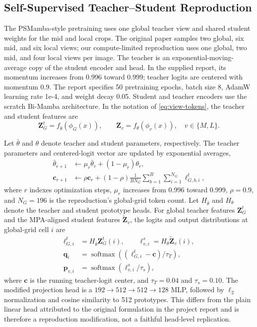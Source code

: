 \documentclass[conference]{IEEEtran}
\begin{document}
\subsection{Self-Supervised Teacher--Student Reproduction}
The PSMamba-style pretraining uses one global teacher view and shared student weights for the mid and local crops. The original paper samples two global, six mid, and six local views; our compute-limited reproduction uses one global, two mid, and four local views per image. The teacher is an exponential-moving-average copy of the student encoder and head. In the supplied report, its momentum increases from 0.996 toward 0.999; teacher logits are centered with momentum 0.9. The report specifies 50 pretraining epochs, batch size 8, AdamW learning rate 1e-4, and weight decay 0.05. Student and teacher encoders use the scratch Bi-Mamba architecture. In the notation of \eqref{eq:view-tokens}, the teacher and student features are
\begin{equation}
    \mathbf{Z}^{t}_G=f_{\bar{\theta}}(\phi_G(x)),\qquad
    \mathbf{Z}_v=f_{\theta}(\phi_v(x)),\quad v\in\{M,L\}.
    \label{eq:teacher-features}
\end{equation}

Let $\bar{\theta}$ and $\theta$ denote teacher and student parameters, respectively. The teacher parameters and centered-logit vector are updated by exponential averages,
\begin{align}
    \bar{\theta}_{r+1} &\leftarrow \mu_r\bar{\theta}_{r}+(1-\mu_r)\theta_r,\\
    \mathbf{c}_{r+1} &\leftarrow \rho\mathbf{c}_{r}+(1-\rho)\frac{1}{BN_G}\sum_{b=1}^{B}\sum_{i=1}^{N_G}\boldsymbol{\ell}^{t}_{G,b,i},
    \label{eq:teacher-ema}
\end{align}
where $r$ indexes optimization steps, $\mu_r$ increases from 0.996 toward 0.999, $\rho=0.9$, and $N_G=196$ is the reproduction's global-grid token count. Let $H_{\bar{\theta}}$ and $H_{\theta}$ denote the teacher and student prototype heads. For global teacher features $\mathbf{Z}^{t}_G$ and the MPA-aligned student features $\widetilde{\mathbf{Z}}_v$, the logits and output distributions at global-grid cell $i$ are
\begin{align}
    \boldsymbol{\ell}^{t}_{G,i} &= H_{\bar{\theta}}\mathbf{Z}^{t}_G(i),\qquad
    \boldsymbol{\ell}^{s}_{v,i} = H_{\theta}\widetilde{\mathbf{Z}}_v(i),\\
    \mathbf{q}_{i} &= \operatorname{softmax}\!\left((\boldsymbol{\ell}^{t}_{G,i}-\mathbf{c})/\tau_T\right),\\
    \mathbf{p}_{v,i} &= \operatorname{softmax}\!\left(\boldsymbol{\ell}^{s}_{v,i}/\tau_s\right),
    \label{eq:teacher-student-distributions}
\end{align}
where $\mathbf{c}$ is the running teacher-logit center, and $\tau_T=0.04$ and $\tau_s=0.10$. The modified projection head is a $192\rightarrow512\rightarrow512\rightarrow128$ MLP, followed by $\ell_2$ normalization and cosine similarity to 512 prototypes. This differs from the plain linear head attributed to the original formulation in the project report and is therefore a reproduction modification, not a faithful head-level replication.
\end{document}
